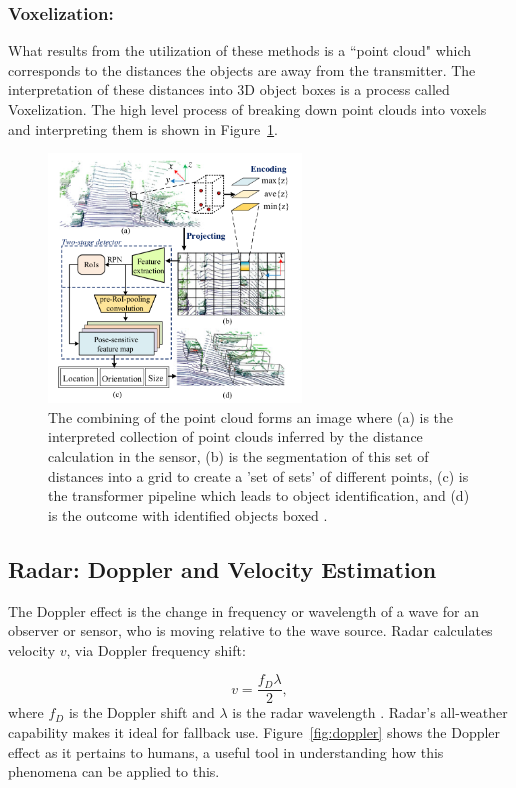 \documentclass[12pt]{article}
\begin{document}
\subsubsection{Voxelization:}
What results from the utilization of these methods is a ``point cloud" which
corresponds to the distances the objects are away from the transmitter. The
interpretation of these distances into 3D object boxes is a process called
Voxelization. The high level process of breaking down point clouds into voxels and
interpreting them is shown in Figure~\ref{fig:voxelization}.
\begin{figure}[H]
	\centering
	\includegraphics[width=0.6\textwidth]{voxelization.png}
	\caption{The combining of the point cloud forms an image where (a) is the
	interpreted collection of point clouds inferred by the distance calculation in the sensor, (b) is the
segmentation of this set of distances into a grid to create a 'set of sets' of
different points, (c) is the transformer pipeline which leads to object
identification, and (d) is the outcome with identified objects boxed
\autocite{RT3D}.}

	\label{fig:voxelization}
\end{figure}

\subsection{Radar: Doppler and Velocity Estimation}

The Doppler effect is the change in frequency or wavelength of a wave for an
observer or sensor, who is moving relative to the wave source. Radar calculates velocity $v$, via Doppler frequency shift:

\begin{equation}
v = \frac{f_D \lambda}{2},
\label{eq:radar_doppler}
\end{equation}
where \( f_D \) is the Doppler shift and \( \lambda \) is the radar wavelength
\cite{Han2023FourDRadarSurvey}. Radar’s all-weather capability makes it ideal
for fallback use. Figure~\ref{fig:doppler} shows the Doppler effect as it
pertains to humans, a useful tool in understanding how this phenomena can be
applied to this.
\end{document}
